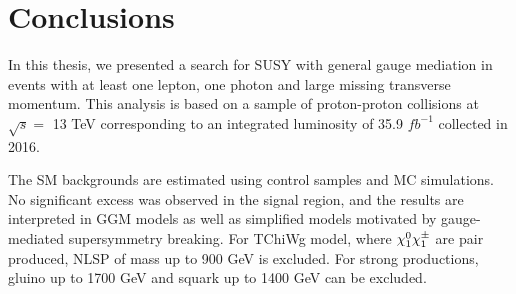 \documentclass[thesis.tex]{subfiles}
\renewcommand\_{\textunderscore\allowbreak}
\begin{document}
\chapter{Conclusions}
\label{sec:conclusions}
In this thesis, we presented a search for SUSY with general gauge mediation in events with at least one lepton, one photon and large missing transverse momentum. This analysis is based on a sample of proton-proton collisions at $\sqrt{s} =$ 13 TeV corresponding to an integrated luminosity of 35.9 $fb^{-1}$ collected in 2016. 

The SM backgrounds are estimated using control samples and MC simulations. No significant excess was observed in the signal region, and the results are interpreted in GGM models as well as simplified models motivated by gauge-mediated supersymmetry breaking. For TChiWg model, where $\chi_1^0\chi_1^\pm$ are pair produced, NLSP of mass up to 900 GeV is excluded. For strong productions, gluino up to 1700 GeV and squark up to 1400 GeV can be excluded. 
\end{document}
